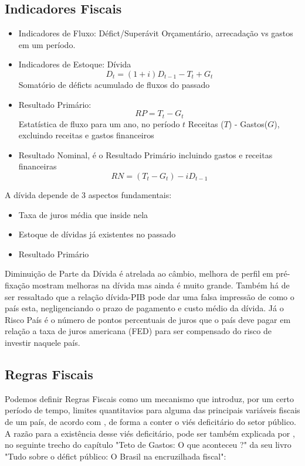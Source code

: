 \subsection*{Indicadores Fiscais}
\begin{itemize}
    \item Indicadores de Fluxo: Défict/Superávit Orçamentário, arrecadação vs gastos em um período. 
    \item Indicadores de Estoque: Dívida 
    \begin{equation}
        D_{t} = (1+i)D_{t-1} - T_{t} + G_{t}
    \end{equation}
    Somatório de déficts acumulado de fluxos do passado
    \item Resultado Primário:
    \begin{equation}
        RP = T_{t} - G_{t}
    \end{equation}
    Estatística de fluxo para um ano, no período $t$
    Receitas ($T$) - Gastos($G$), excluindo receitas e gastos financeiros 
    \item Resultado Nominal, é o Resultado Primário incluindo gastos e receitas financeiras
    \begin{equation}
        RN = (T_{t} - G_{t}) - iD_{t-1}
    \end{equation}
\end{itemize}

A dívida depende de 3 aspectos fundamentais:
\begin{itemize}
    \item Taxa de juros média que inside nela 
    \item Estoque de dívidas já existentes no passado
    \item Resultado Primário 
\end{itemize}
Diminuição de Parte da Dívida é atrelada ao câmbio, melhora de perfil em pré-fixação mostram melhoras na dívida mas ainda é muito grande. Também há de ser ressaltado que a relação dívida-PIB pode dar uma falsa impressão de como o país esta, negligenciando o prazo de pagamento e custo médio da dívida. 
Já o Risco País é o número de pontos percentuais de juros que o país deve pagar em relação a taxa de juros americana (FED) para ser compensado do risco de investir naquele país. 
\subsection*{Regras Fiscais}
Podemos definir Regras Fiscais como um mecanismo que introduz, por um certo período de tempo, limites quantitavios para alguma das principais variáveis fiscais de um país, de acordo com \cite{Giambiagi}, de forma a conter o viés deficitário do setor público. 
A razão para a existência desse viés deficitário, pode ser também explicada por \cite{Giambiagi}, no seguinte trecho do capítulo "Teto de Gastos: O que aconteceu ?" da seu livro "Tudo sobre o défict público: O Brasil na encruzilhada fiscal": 

